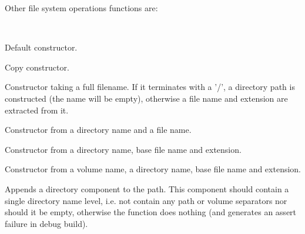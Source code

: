 Other file system operations functions are:

\\



\label{wxfilenamewxfilename}


Default constructor.


Copy constructor.


Constructor taking a full filename. If it terminates with a '/', a directory path
is constructed (the name will be empty), otherwise a file name and
extension are extracted from it.


Constructor from a directory name and a file name.


Constructor from a directory name, base file name and extension.


Constructor from a volume name, a directory name, base file name and extension.


\label{wxfilenameappenddir}


Appends a directory component to the path. This component should contain a
single directory name level, i.e. not contain any path or volume separators nor
should it be empty, otherwise the function does nothing (and generates an
assert failure in debug build).


\label{wxfilenameassign}

